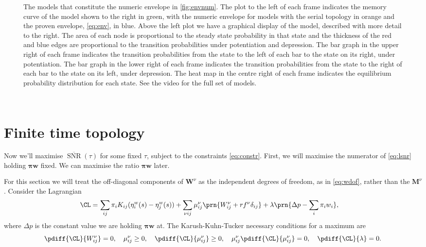 \documentclass[12pt]{article}
\newcommand{\eqm}{\pi}
\newcommand{\eq}{\boldsymbol{\eqm}}
\newcommand{\etwm}{\eta^w}
\newcommand{\wm}{w}
\newcommand{\w}{\mathbf{\wm}}
\newcommand{\Wm}{W}
\newcommand{\W}{\mathbf{\Wm}}
\newcommand{\MMdm}{M}
\newcommand{\MMd}{\mathbf{\MMdm}}
\newcommand{\encm}{K}
\newcommand{\kktm}{\mu}
\DeclareMathOperator{\snr}{SNR}
\newcommand{\snrb}{\overline{\snr}}
\begin{document}
\begin{figure}[tbp]
\begin{myenuma}
  \end{myenuma}
  \caption[Optimal models]{The models that constitute the numeric envelope in \cref{fig:envnum}.
  The plot to the left of each frame indicates the memory curve of the model shown to the right in green, with the numeric envelope for models with the serial topology in orange and the proven envelope, \eqref{eq:env}, in blue.
  Above the left plot we have a graphical display of the model, described with more detail to the right.
  The area of each node is proportional to the steady state probability in that state and the thickness of the red and blue edges are proportional to the transition probabilities under potentiation and depression.
  The bar graph in the upper right of each frame indicates the transition probabilities from the state to the left of each bar to the state on its right, under potentiation.
  The bar graph in the lower right of each frame indicates the transition probabilities from the state to the right of each bar to the state on its left, under depression.
  The heat map in the centre right of each frame indicates the equilibrium probability distribution for each state.
  See the video for the full set of models.}\label{fig:envvid}
\end{figure}
\


\section{Finite time topology}\label{sec:finite}

Now we'll maximise \(\snrb(\tau)\) for some fixed \(\tau\), subject to the constraints \eqref{eq:constr}.
First, we will maximise the numerator of \eqref{eq:lsnr} holding \(\eq\w\) fixed.
We can maximise the ratio \wrt \(\eq\w\) later.

For this section we will treat the off-diagonal components of \(\W^\nu\) as the independent degrees of freedom, as in \cref{eq:wdof}, rather than the \(\MMd^\nu\).
Consider the Lagrangian
%
\begin{equation}\label{eq:finitelagrangian}
\begin{aligned}
  \CL =&\, \sum_{ij} \eqm_i \encm_{ij} (\etwm_i(s) - \etwm_j(s))
        +\sum_{\nu i j} \kktm^\nu_{ij} \prn{ \Wm^\nu_{ij} + r f^\nu \delta_{ij} }
        + \lambda \prn{ \Delta p - \sum_i \eqm_i \wm_i },
\end{aligned}
\end{equation}
%
where \(\Delta p\) is the constant value we are holding \(\eq\w\) at.
The Karush-Kuhn-Tucker necessary conditions for a maximum are
%
\begin{equation}\label{eq:KTfinite}
  \pdiff{\CL}{\Wm^\nu_{ij}} = 0, \quad
  \kktm^\nu_{ij} \geq 0, \quad
  \pdiff{\CL}{\kktm^\nu_{ij}} \geq 0, \quad
  \kktm^\nu_{ij}\pdiff{\CL}{\kktm^\nu_{ij}} = 0, \quad
  \pdiff{\CL}{\lambda} = 0.
\end{equation}
%
\end{document}
